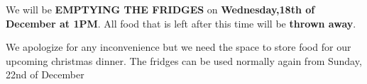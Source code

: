 \documentclass{article}
\begin{document}
\fontsize{40}{50}\selectfont

\parindent 0pt
\parskip 20pt

\maketitle
\null
\vspace{-1cm}

\begin{center}

\Huge

We will be {\bfseries\color{red}EMPTYING THE FRIDGES} on {\bfseries Wednesday,18th of December at 1PM}. All food that is left after this time will be
{\bfseries\color{red}thrown away}.

\huge

We apologize for any inconvenience but we need the space to store food for our upcoming christmas dinner. The
fridges can be used normally again from Sunday, 22nd of December
\end{center}

\underskriv
\end{document}
